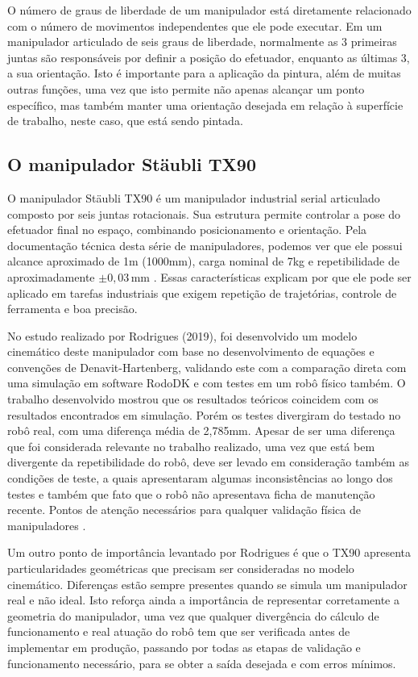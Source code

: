 O número de graus de liberdade de um manipulador está diretamente relacionado com o número de movimentos independentes que ele pode executar. Em um manipulador articulado de seis graus de liberdade, normalmente as 3 primeiras juntas são responsáveis por definir a posição do efetuador, enquanto as últimas 3, a sua orientação. Isto é importante para a aplicação da pintura, além de muitas outras funções, uma vez que isto permite não apenas alcançar um ponto específico, mas também manter uma orientação desejada em relação à superfície de trabalho, neste caso, que está sendo pintada.


\subsection{O manipulador Stäubli TX90}

O manipulador Stäubli TX90 é um manipulador industrial serial articulado composto por seis juntas rotacionais. Sua estrutura permite controlar a pose do efetuador final no espaço, combinando posicionamento e orientação. Pela documentação técnica desta série de manipuladores, podemos ver que ele possui alcance aproximado de 1m (1000mm), carga nominal de 7kg e repetibilidade de aproximadamente $\pm0{,}03\,\text{mm}$ \cite{staubli2017}. Essas características explicam por que ele pode ser aplicado em tarefas industriais que exigem repetição de trajetórias, controle de ferramenta e boa precisão.

No estudo realizado por Rodrigues (2019), foi desenvolvido um modelo cinemático deste manipulador com base no desenvolvimento de equações e convenções de Denavit-Hartenberg, validando este com a comparação direta com uma simulação em software RodoDK e com testes em um robô físico também. O trabalho desenvolvido mostrou que os resultados teóricos coincidem com os resultados encontrados em simulação. Porém os testes divergiram do testado no robô real, com uma diferença média de 2,785mm. Apesar de ser uma diferença que foi considerada relevante no trabalho realizado, uma vez que está bem divergente da repetibilidade do robô, deve ser levado em consideração também as condições de teste, a quais apresentaram algumas inconsistências ao longo dos testes e também que fato que o robô não apresentava ficha de manutenção recente. Pontos de atenção necessários para qualquer validação física de manipuladores \cite{rodrigues2019}.

Um outro ponto de importância levantado por Rodrigues é que o TX90 apresenta particularidades geométricas que precisam ser consideradas no modelo cinemático. Diferenças estão sempre presentes quando se simula um manipulador real e não ideal. Isto reforça ainda a importância de representar corretamente a geometria do manipulador, uma vez que qualquer divergência do cálculo de funcionamento e real atuação do robô tem que ser verificada antes de implementar em produção, passando por todas as etapas de validação e funcionamento necessário, para se obter a saída desejada e com erros mínimos.

